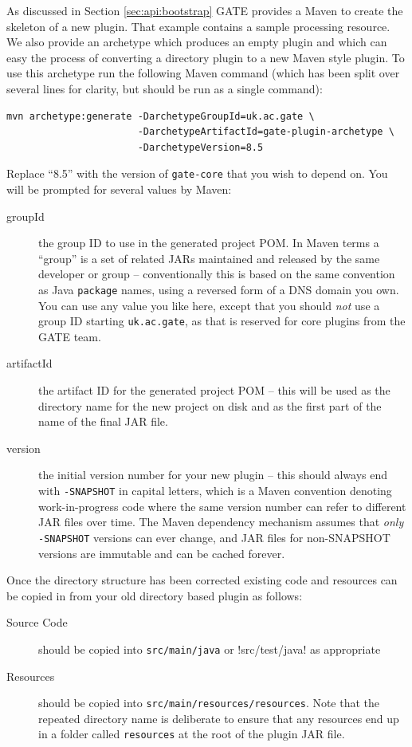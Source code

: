 As discussed in Section \ref{sec:api:bootstrap} GATE provides a Maven 
to create the skeleton of a new plugin. That example contains a sample processing
resource. We also provide an archetype which produces an empty plugin and which
can easy the process of converting a directory plugin to a new Maven style plugin.
To use this archetype run the following Maven
command (which has been split over several lines for clarity, but should be run
as a single command):
\begin{verbatim}
mvn archetype:generate -DarchetypeGroupId=uk.ac.gate \
                       -DarchetypeArtifactId=gate-plugin-archetype \
                       -DarchetypeVersion=8.5
\end{verbatim}
Replace ``8.5'' with the version of \texttt{gate-core} that you wish to depend
on.  You will be prompted for several values by Maven:
\begin{description}
\item[groupId] the group ID to use in the generated project POM. In Maven terms
  a ``group'' is a set of related JARs maintained and released by the same
  developer or group -- conventionally this is based on the same convention as
  Java \texttt{package} names, using a reversed form of a DNS domain you own.
  You can use any value you like here, except that you should \emph{not} use
  a group ID starting \texttt{uk.ac.gate}, as that is reserved for core plugins
  from the GATE team.
\item[artifactId] the artifact ID for the generated project POM -- this will be
  used as the directory name for the new project on disk and as the first part
  of the name of the final JAR file.
\item[version] the initial version number for your new plugin -- this should
  always end with \verb!-SNAPSHOT! in capital letters, which is a Maven
  convention denoting work-in-progress code where the same version number can
  refer to different JAR files over time.  The Maven dependency mechanism
  assumes that \emph{only} \verb!-SNAPSHOT! versions can ever change, and
  JAR files for non-SNAPSHOT versions are immutable and can be cached forever.
\end{description}

Once the directory structure has been corrected existing code and resources can
be copied in from your old directory based plugin as follows:

\begin{description}
\item[Source Code] should be copied into \verb!src/main/java! or \vebr!src/test/java!
  as appropriate
\item[Resources] should be copied into \verb!src/main/resources/resources!. Note that 
  the repeated directory name is deliberate to ensure that any resources end up in a
  folder called \verb!resources! at the root of the plugin JAR file.
\end{description}

